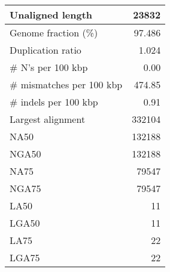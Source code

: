 \documentclass[12pt,a4paper]{article}
\begin{document}
\begin{table}[ht]
\begin{center}
\begin{tabular}{|l*{1}{|r}|}
Unaligned length & 23832 \\ \hline
Genome fraction (\%) & 97.486 \\ \hline
Duplication ratio & 1.024 \\ \hline
\# N's per 100 kbp & 0.00 \\ \hline
\# mismatches per 100 kbp & 474.85 \\ \hline
\# indels per 100 kbp & 0.91 \\ \hline
Largest alignment & 332104 \\ \hline
NA50 & 132188 \\ \hline
NGA50 & 132188 \\ \hline
NA75 & 79547 \\ \hline
NGA75 & 79547 \\ \hline
LA50 & 11 \\ \hline
LGA50 & 11 \\ \hline
LA75 & 22 \\ \hline
LGA75 & 22 \\ \hline
\end{tabular}
\end{center}
\end{table}
\end{document}
